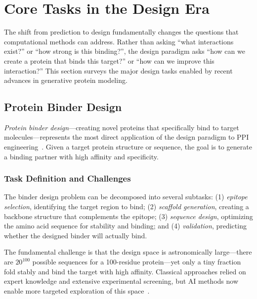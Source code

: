 
\section{Core Tasks in the Design Era}
\label{sec:design_tasks}

The shift from prediction to design fundamentally changes the questions that computational methods can address. Rather than asking ``what interactions exist?'' or ``how strong is this binding?'', the design paradigm asks ``how can we create a protein that binds this target?'' or ``how can we improve this interaction?'' This section surveys the major design tasks enabled by recent advances in generative protein modeling.

\subsection{Protein Binder Design}
\label{subsec:binder}

\textit{Protein binder design}---creating novel proteins that specifically bind to target molecules---represents the most direct application of the design paradigm to PPI engineering~\cite{watson2023rfdiffusion,zambaldi2024alphaproteo}. Given a target protein structure or sequence, the goal is to generate a binding partner with high affinity and specificity.

\subsubsection{Task Definition and Challenges}

The binder design problem can be decomposed into several subtasks: (1) \textit{epitope selection}, identifying the target region to bind; (2) \textit{scaffold generation}, creating a backbone structure that complements the epitope; (3) \textit{sequence design}, optimizing the amino acid sequence for stability and binding; and (4) \textit{validation}, predicting whether the designed binder will actually bind.

The fundamental challenge is that the design space is astronomically large---there are $20^{100}$ possible sequences for a 100-residue protein---yet only a tiny fraction fold stably and bind the target with high affinity. Classical approaches relied on expert knowledge and extensive experimental screening, but AI methods now enable more targeted exploration of this space~\cite{watson2023rfdiffusion}.

